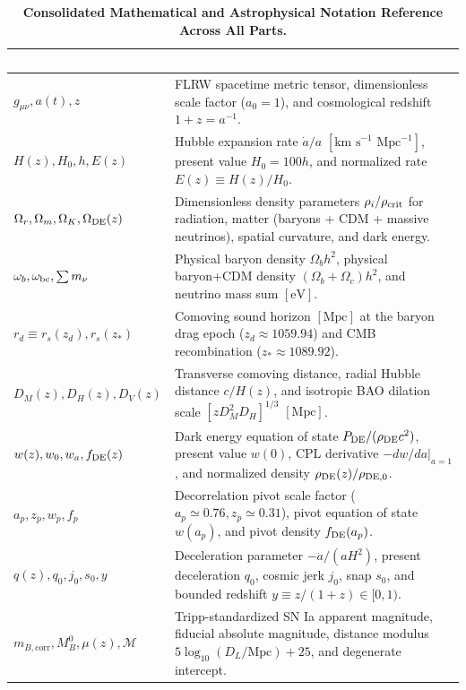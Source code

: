 \documentclass[11pt,letterpaper]{article}
\renewcommand{\arraystretch}{1.20}
\begin{document}
\begin{table}[!htbp]
\centering
\caption{\textbf{Consolidated Mathematical and Astrophysical Notation Reference Across All Parts.}}
\label{tab:notation_ref}
\footnotesize
\renewcommand{\arraystretch}{1.22}
\begin{tabularx}{\textwidth}{>{\bfseries\color{primary}}p{} X}
\toprule
\rowcolor{primary} \textcolor{white}{\textbf{Symbol}} & \textcolor{white}{\textbf{Physical Meaning, Definition, and Units}} \\
\midrule
$g_{\mu\nu}, a(t), z$ & FLRW spacetime metric tensor, dimensionless scale factor ($a_0 = 1$), and cosmological redshift $1+z = a^{-1}$. \\
$H(z), H_0, h, E(z)$ & Hubble expansion rate $\dot{a}/a$ $[\text{km s}^{-1}\text{ Mpc}^{-1}]$, present value $H_0 = 100h$, and normalized rate $E(z) \equiv H(z)/H_0$. \\
$\Omega_r, \Omega_m, \Omega_K, \Omega_{\rm DE}(z)$ & Dimensionless density parameters $\rho_i / \rho_{\rm crit}$ for radiation, matter (baryons + CDM + massive neutrinos), spatial curvature, and dark energy. \\
$\omega_b, \omega_{\rm bc}, \sum m_\nu$ & Physical baryon density $\Omega_b h^2$, physical baryon+CDM density $(\Omega_b+\Omega_c)h^2$, and neutrino mass sum $[\text{eV}]$. \\
$r_d \equiv r_s(z_d), r_s(z_*)$ & Comoving sound horizon $[\text{Mpc}]$ at the baryon drag epoch ($z_d \approx 1059.94$) and CMB recombination ($z_* \approx 1089.92$). \\
$D_M(z), D_H(z), D_V(z)$ & Transverse comoving distance, radial Hubble distance $c/H(z)$, and isotropic BAO dilation scale $[z D_M^2 D_H]^{1/3}$ $[\text{Mpc}]$. \\
$w(z), w_0, w_a, f_{\rm DE}(z)$ & Dark energy equation of state $P_{\rm DE}/(\rho_{\rm DE}c^2)$, present value $w(0)$, CPL derivative $-dw/da|_{a=1}$, and normalized density $\rho_{\rm DE}(z)/\rho_{\rm DE,0}$. \\
$a_p, z_p, w_p, f_p$ & Decorrelation pivot scale factor ($a_p \simeq 0.76, z_p \simeq 0.31$), pivot equation of state $w(a_p)$, and pivot density $f_{\rm DE}(a_p)$. \\
$q(z), q_0, j_0, s_0, y$ & Deceleration parameter $-\ddot{a}/(aH^2)$, present deceleration $q_0$, cosmic jerk $j_0$, snap $s_0$, and bounded redshift $y \equiv z/(1+z) \in [0,1)$. \\
$m_{B,\text{corr}}, M_B^0, \mu(z), \mathcal{M}$ & Tripp-standardized SN Ia apparent magnitude, fiducial absolute magnitude, distance modulus $5\log_{10}(D_L/\text{Mpc})+25$, and degenerate intercept. \\

\end{tabularx}
\end{table}
\end{document}
